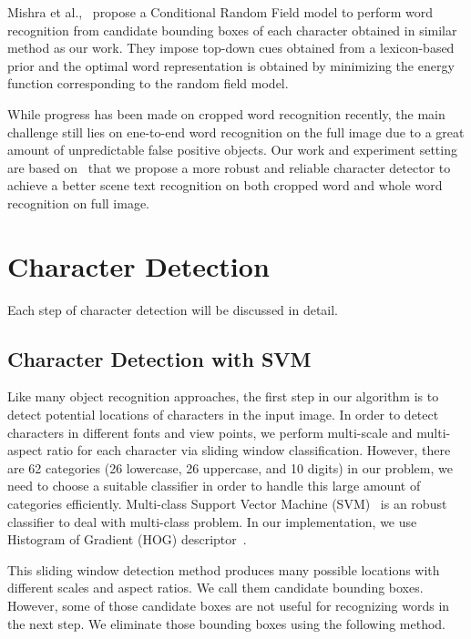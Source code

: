 \documentclass[10pt,twocolumn,letterpaper]{article}
\begin{document}
Mishra et al.,~\cite{111} propose a Conditional Random Field model to perform word recognition from candidate bounding boxes of each character obtained in similar method as our work. They impose top-down cues obtained from a lexicon-based prior and the optimal word representation is obtained by minimizing the energy function corresponding to the random field model.

While progress has been made on cropped word recognition recently, the main challenge still lies on ene-to-end word recognition on the full image due to a great amount of unpredictable false positive objects. Our work and experiment setting are based on~\cite{417} that we propose a more robust and reliable character detector to achieve a better scene text recognition on both cropped word and whole word recognition on full image.

\section{Character Detection}

Each step of character detection will be discussed in detail.

\subsection{Character Detection with SVM}

Like many object recognition approaches, the first step in our algorithm is to detect potential locations of characters in the input image. In order to detect characters in different fonts and view points, we perform multi-scale and multi-aspect ratio for each character via sliding window classification. However, there are 62 categories (26 lowercase, 26 uppercase, and 10 digits) in our problem, we need to choose a suitable classifier in order to handle this large amount of categories efficiently. Multi-class Support Vector Machine (SVM)~\cite{122} is an robust classifier to deal with multi-class problem. In our implementation, we use Histogram of Gradient (HOG) descriptor~\cite{115}.

This sliding window detection method produces many possible locations with different scales and aspect ratios. We call them candidate bounding boxes. However, some of those candidate boxes are not useful for recognizing words in the next step. We eliminate those bounding boxes using the following method.
\end{document}
